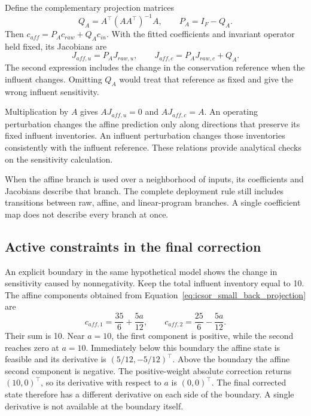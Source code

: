 Define the complementary projection matrices
\begin{equation}
\label{eq:icsor_projection_matrices}
Q_A=A^\top(AA^\top)^{-1}A,
\qquad P_A=I_F-Q_A.
\end{equation}
Then \(c_{aff}=P_Ac_{raw}+Q_Ac_{in}\). With the fitted coefficients and invariant operator held fixed, its Jacobians are
\begin{equation}
\label{eq:icsor_affine_jacobians}
J_{aff,u}=P_AJ_{raw,u},
\qquad J_{aff,c}=P_AJ_{raw,c}+Q_A.
\end{equation}
The second expression includes the change in the conservation reference when the influent changes. Omitting \(Q_A\) would treat that reference as fixed and give the wrong influent sensitivity.

Multiplication by \(A\) gives \(AJ_{aff,u}=0\) and \(AJ_{aff,c}=A\). An operating perturbation changes the affine prediction only along directions that preserve its fixed influent inventories. An influent perturbation changes those inventories consistently with the influent reference. These relations provide analytical checks on the sensitivity calculation.

When the affine branch is used over a neighborhood of inputs, its coefficients and Jacobians describe that branch. The complete deployment rule still includes transitions between raw, affine, and linear-program branches. A single coefficient map does not describe every branch at once.

\subsection{Active constraints in the final correction}

An explicit boundary in the same hypothetical model shows the change in sensitivity caused by nonnegativity. Keep the total influent inventory equal to 10. The affine components obtained from Equation~\eqref{eq:icsor_small_back_projection} are
\begin{equation}
\label{eq:icsor_small_affine_branch}
c_{aff,1}=\frac{35}{6}+\frac{5a}{12},
\qquad
c_{aff,2}=\frac{25}{6}-\frac{5a}{12}.
\end{equation}
Their sum is 10. Near \(a=10\), the first component is positive, while the second reaches zero at \(a=10\). Immediately below this boundary the affine state is feasible and its derivative is \((5/12,-5/12)^\top\). Above the boundary the affine second component is negative. The positive-weight absolute correction returns \((10,0)^\top\), so its derivative with respect to \(a\) is \((0,0)^\top\). The final corrected state therefore has a different derivative on each side of the boundary. A single derivative is not available at the boundary itself.

